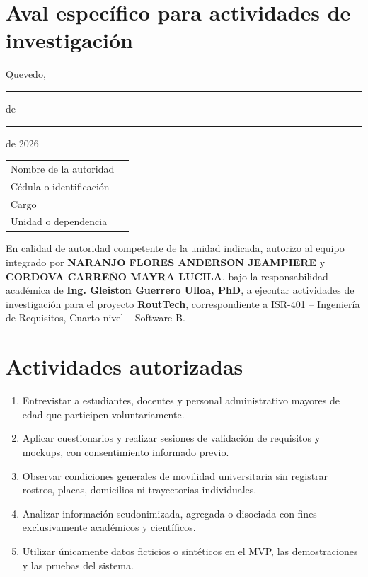 \documentclass[11pt,a4paper]{article}
\newcommand{\Asignatura}{ISR-401 -- Ingeniería de Requisitos}
\newcommand{\Paralelo}{Cuarto nivel -- Software B}
\newcommand{\Docente}{Ing. Gleiston Guerrero Ulloa, PhD}
\newcommand{\Anderson}{NARANJO FLORES ANDERSON JEAMPIERE}
\newcommand{\Mayra}{CORDOVA CARREÑO MAYRA LUCILA}
\begin{document}
\section{Aval específico para actividades de investigación}

\begin{flushright}
Quevedo, \rule{1.0cm}{0.4pt} de \rule{3.0cm}{0.4pt} de 2026
\end{flushright}

\noindent
\begin{tabularx}{\textwidth}{L{4.1cm} Y}
Nombre de la autoridad & \hrulefill\\
Cédula o identificación & \hrulefill\\
Cargo & \hrulefill\\
Unidad o dependencia & \hrulefill\\
\end{tabularx}

\vspace{0.25cm}
\noindent En calidad de autoridad competente de la unidad indicada, autorizo al equipo integrado por \textbf{\Anderson} y \textbf{\Mayra}, bajo la responsabilidad académica de \textbf{\Docente}, a ejecutar actividades de investigación para el proyecto \textbf{RoutTech}, correspondiente a \Asignatura, \Paralelo.

\section{Actividades autorizadas}

\begin{enumerate}
  \item Entrevistar a estudiantes, docentes y personal administrativo mayores de edad que participen voluntariamente.
  \item Aplicar cuestionarios y realizar sesiones de validación de requisitos y mockups, con consentimiento informado previo.
  \item Observar condiciones generales de movilidad universitaria sin registrar rostros, placas, domicilios ni trayectorias individuales.
  \item Analizar información seudonimizada, agregada o disociada con fines exclusivamente académicos y científicos.
  \item Utilizar únicamente datos ficticios o sintéticos en el MVP, las demostraciones y las pruebas del sistema.
\end{enumerate}
\end{document}
